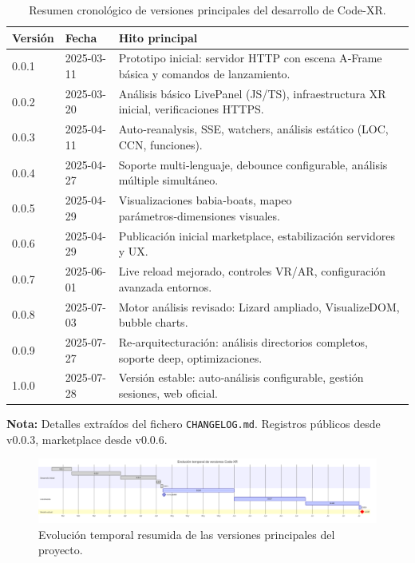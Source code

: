 \documentclass[a4paper, 12pt]{book}
\begin{document}
\begin{table}[!htbp]
\centering\footnotesize
\begin{tabular}{p{1.8cm} p{2.2cm} p{10.5cm}}
\hline
\textbf{Versión} & \textbf{Fecha} & \textbf{Hito principal} \\
\hline
0.0.1 & 2025-03-11 & Prototipo inicial: servidor HTTP con escena A‑Frame básica y comandos de lanzamiento. \\
0.0.2 & 2025-03-20 & Análisis básico LivePanel (JS/TS), infraestructura XR inicial, verificaciones HTTPS. \\
0.0.3 & 2025-04-11 & Auto‑reanalysis, SSE, watchers, análisis estático (LOC, CCN, funciones). \\
0.0.4 & 2025-04-27 & Soporte multi‑lenguaje, debounce configurable, análisis múltiple simultáneo. \\
0.0.5 & 2025-04-29 & Visualizaciones babia‑boats, mapeo parámetros‑dimensiones visuales. \\
0.0.6 & 2025-04-29 & Publicación inicial marketplace, estabilización servidores y UX. \\
0.0.7 & 2025-06-01 & Live reload mejorado, controles VR/AR, configuración avanzada entornos. \\
0.0.8 & 2025-07-03 & Motor análisis revisado: Lizard ampliado, VisualizeDOM, bubble charts. \\
0.0.9 & 2025-07-27 & Re‑arquitecturación: análisis directorios completos, soporte deep, optimizaciones. \\
1.0.0 & 2025-07-28 & Versión estable: auto‑análisis configurable, gestión sesiones, web oficial. \\
\hline
\end{tabular}
\caption{Resumen cronológico de versiones principales del desarrollo de Code-XR.}
\label{tab:changelog}
\end{table}


\noindent \textbf{Nota:} Detalles extraídos del fichero \texttt{CHANGELOG.md}. Registros públicos desde v0.0.3, marketplace desde v0.0.6.


\begin{figure}[H]
  \centering
  \includegraphics[width=\textwidth]{img/versions_gantt.png}
  \caption{Evolución temporal resumida de las versiones principales del proyecto.}
  \label{fig:timeline-versions}
\end{figure}
\end{document}
